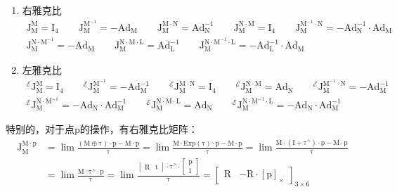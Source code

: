 \documentclass[12pt, onecolumn]{article}
\newcommand\skewmat[1]{\left[ #1 \right]_\times}
\newcommand\liehat[1]{#1^{\land}}
\newcommand\Exp[1]{\mathrm{Exp}\left( #1\right) }
\newcommand\bsm[1]{\boldsymbol{\mathrm{#1}}}
\begin{document}
	\begin{enumerate}
	\item 右雅克比
	\begin{equation}
	\begin{gathered}
	\bsm{J}_{\bsm{M}}^{\bsm{M}}=\bsm{I}_4
	\qquad
	\bsm{J}_{\bsm{M}}^{\bsm{M}^{-1}}=-\bsm{Ad}_{\bsm{M}}
	\qquad
	\bsm{J}_{\bsm{M}}^{\bsm{M}\cdot\bsm{N}}=\bsm{Ad}_{\bsm{N}}^{-1}
	\qquad
	\bsm{J}_{\bsm{M}}^{\bsm{N}\cdot\bsm{M}}=\bsm{I}_4
	\qquad
	\bsm{J}_{\bsm{M}}^{\bsm{M}^{-1}\cdot\bsm{N}}=-\bsm{Ad}_{\bsm{N}}^{-1}\cdot\bsm{Ad}_{\bsm{M}}
	\\
	\bsm{J}_{\bsm{M}}^{\bsm{N}\cdot\bsm{M}^{-1}}=-\bsm{Ad}_{\bsm{M}}
	\qquad
	\bsm{J}_{\bsm{M}}^{\bsm{N}\cdot\bsm{M}\cdot\bsm{L}}=\bsm{Ad}_{\bsm{L}}^{-1}
	\qquad
	\bsm{J}_{\bsm{M}}^{\bsm{N}\cdot\bsm{M}^{-1}\cdot\bsm{L}}=
	-\bsm{Ad}_{\bsm{L}}^{-1}\cdot\bsm{Ad}_{\bsm{M}}
	\end{gathered}
	\end{equation}

	\item 左雅克比
	\begin{equation}
	\begin{gathered}
	^\mathcal{E}\bsm{J}_{\bsm{M}}^{\bsm{M}}=\bsm{I}_4
	\qquad
	^\mathcal{E}\bsm{J}_{\bsm{M}}^{\bsm{M}^{-1}}=-\bsm{Ad}_{\bsm{M}}^{-1}
	\qquad
	^\mathcal{E}\bsm{J}_{\bsm{M}}^{\bsm{M}\cdot\bsm{N}}=\bsm{I}_4
	\qquad
	^\mathcal{E}\bsm{J}_{\bsm{M}}^{\bsm{N}\cdot\bsm{M}}=\bsm{Ad}_{\bsm{N}}
	\qquad
	^\mathcal{E}\bsm{J}_{\bsm{M}}^{\bsm{M}^{-1}\cdot\bsm{N}}=-\bsm{Ad}_{\bsm{M}}^{-1}
	\\
	^\mathcal{E}\bsm{J}_{\bsm{M}}^{\bsm{N}\cdot\bsm{M}^{-1}}=-\bsm{Ad}_{\bsm{N}}\cdot\bsm{Ad}_{\bsm{M}}^{-1}
	\qquad
	^\mathcal{E}\bsm{J}_{\bsm{M}}^{\bsm{N}\cdot\bsm{M}\cdot\bsm{L}}=\bsm{Ad}_{\bsm{N}}
	\qquad
	^\mathcal{E}\bsm{J}_{\bsm{M}}^{\bsm{N}\cdot\bsm{M}^{-1}\cdot\bsm{L}}=-\bsm{Ad}_{\bsm{N}}\cdot\bsm{Ad}_{\bsm{M}}^{-1}
	\end{gathered}
	\end{equation}
	\end{enumerate}
	特别的，对于点$\bsm{p}$的操作，有右雅克比矩阵：
	\begin{equation}
	\begin{aligned}
	\bsm{J}_{\bsm{M}}^{\bsm{M}\cdot\bsm{p}}&=
	\lim\frac{\left( \bsm{M}\oplus\bsm{\tau}\right) \cdot\bsm{p}- \bsm{M}\cdot\bsm{p}}{\bsm{\tau}}=
	\lim\frac{\bsm{M}\cdot\Exp{\bsm{\tau}} \cdot\bsm{p}- \bsm{M}\cdot\bsm{p}}{\bsm{\tau}}
	=\lim\frac{\bsm{M}\cdot\left( \bsm{I}+\liehat{\bsm{\tau}}\right)  \cdot\bsm{p}- \bsm{M}\cdot\bsm{p}}{\bsm{\tau}}
	\\&
	=\lim\frac{\bsm{M}\cdot\liehat{\bsm{\tau}}  \cdot\bsm{p}}{\bsm{\tau}}
	=\lim\frac{\begin{bmatrix}
	\bsm{R}&\bsm{t}
	\end{bmatrix}\cdot\liehat{\bsm{\tau}}  \cdot	\begin{bmatrix}
	\bsm{p}\\1
	\end{bmatrix}}{\bsm{\tau}}
	=\begin{bmatrix}
	\bsm{R}&-\bsm{R}\cdot\skewmat{\bsm{p}}
	\end{bmatrix}_{3\times 6}
	\end{aligned}
	\end{equation}
\end{document}
